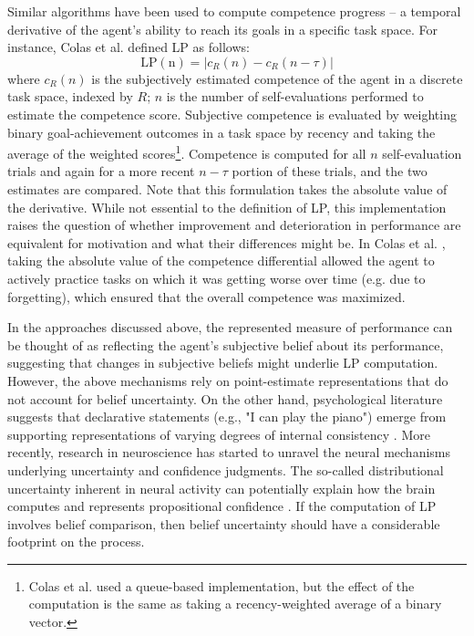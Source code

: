 Similar algorithms have been used to compute competence progress \parencite{baranes_active_2013,santucci_which_2013,colas_curious_2019,forestier_intrinsically_2020} -- a temporal derivative of the agent's ability to reach its goals in a specific task space. For instance, Colas et al. \cite{colas_curious_2019} defined \ac{LP} as follows:
\begin{equation}
    \mathrm{LP(n)} = |c_R(n) - c_R(n-\tau)|
\end{equation}
where $c_R(n)$ is the subjectively estimated competence of the agent in a discrete task space, indexed by $R$; $n$ is the number of self-evaluations performed to estimate the competence score. Subjective competence is evaluated by weighting binary goal-achievement outcomes in a task space by recency and taking the average of the weighted scores\footnote{Colas et al. \parencite{colas_curious_2019} used a queue-based implementation, but the effect of the computation is the same as taking a recency-weighted average of a binary vector.}. Competence is computed for all $n$ self-evaluation trials and again for a more recent $n-\tau$ portion of these trials, and the two estimates are compared. Note that this formulation takes the absolute value of the derivative. While not essential to the definition of \ac{LP}, this implementation raises the question of whether improvement and deterioration in performance are equivalent for motivation and what their differences might be. In Colas et al. \parencite{colas_curious_2019}, taking the absolute value of the competence differential allowed the agent to actively practice tasks on which it was getting worse over time (e.g. due to forgetting), which ensured that the overall competence was maximized.

In the approaches discussed above, the represented measure of performance can be thought of as reflecting the agent's subjective belief about its performance, suggesting that changes in subjective beliefs might underlie \ac{LP} computation. However, the above mechanisms rely on point-estimate representations that do not account for belief uncertainty. On the other hand, psychological literature suggests that declarative statements (e.g., "I can play the piano") emerge from supporting representations of varying degrees of internal consistency \parencite{smith_belief_1991,koriat_self-consistency_2012}. More recently, research in neuroscience has started to unravel the neural mechanisms underlying uncertainty and confidence judgments. The so-called distributional uncertainty inherent in neural activity can potentially explain how the brain computes and represents propositional confidence \parencite{meyniel_confidence_2015,pouget_confidence_2016}. If the computation of \ac{LP} involves belief comparison, then belief uncertainty should have a considerable footprint on the process. 


